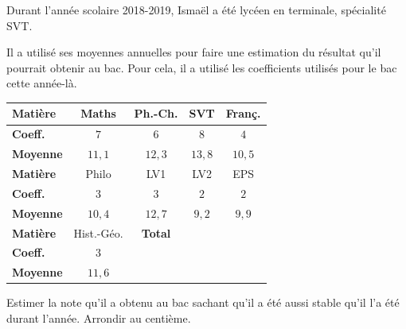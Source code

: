 \begin{exo}
	Durant l'année scolaire 2018-2019, Ismaël a été lycéen en terminale, spécialité SVT.

	Il a utilisé ses moyennes annuelles pour faire une estimation du résultat qu'il pourrait obtenir au bac. Pour cela, il a utilisé les coefficients utilisés pour le bac cette année-là.
	\begin{center}
		\def\arraystretch{1.3}
		\begin{tabular}{|l|c|c|c|c|} \hline
			\textbf{Matière} & Maths      & Ph.-Ch.        & SVT    & Franç. \\ \hline
			\textbf{Coeff.}  & $7$        & $6$            & $8$    & $4$    \\ \hline
			\textbf{Moyenne} & $11,1$     & $12,3$         & $13,8$ & $10,5$ \\ \hline\hline
			\textbf{Matière} & Philo      & LV1            & LV2    & EPS    \\ \hline
			\textbf{Coeff.}  & $3$        & $3$            & $2$    & $2$    \\ \hline
			\textbf{Moyenne} & $10,4$     & $12,7$         & $9,2$  & $9,9$  \\ \hline\hline
			\textbf{Matière} & Hist.-Géo. & \textbf{Total} &        &        \\ \hline
			\textbf{Coeff.}  & $3$        &                &        &        \\ \hline
			\textbf{Moyenne} & $11,6$     &                &        &        \\ \hline
		\end{tabular}
	\end{center}

	Estimer la note qu'il a obtenu au bac sachant qu'il a été aussi stable qu'il l'a été durant l'année. Arrondir au centième.
\end{exo}
